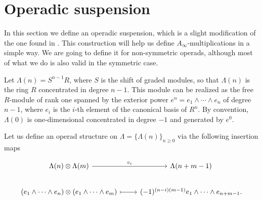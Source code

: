 \documentclass[join.tex]{subfiles}
\begin{document}


\section{Operadic suspension}\label{Sec2}

In this section we define an operadic suspension, which is a slight modification of the one found in \cite{ward}. This construction will help us define $A_\infty$-multiplications in a simple way. We are going to define it for non-symmetric operads, although most of what we do is also valid in the symmetric case.


Let $\Lambda(n)=S^{n-1}R$, where $S$ is the shift of graded modules, so that $\Lambda(n)$ is the ring $R$ concentrated in degree $n-1$. This module can be realized as the free $R$-module of rank one spanned by the exterior power $e^n=e_1\land\cdots\land e_n$ of degree $n-1$, where $e_i$ is the $i$-th element of the canonical basis of $R^n$. By convention, $\Lambda(0)$ is one-dimensional concentrated in degree $-1$ and generated by $e^0$.


Let us define an operad structure on $\Lambda=\{\Lambda(n)\}_{n\geq 0}$ via the following insertion maps

\[
\begin{tikzcd}
\Lambda(n)\otimes\Lambda(m) \arrow[r, "\circ_i"] & \Lambda(n+m-1)\\
(e_1\land\cdots\land e_n)\otimes(e_1\land\cdots\land e_m)\arrow[r, mapsto] & (-1)^{(n-i)(m-1)}e_1\land\cdots\land e_{n+m-1}.
\end{tikzcd}
\]
\end{document}
